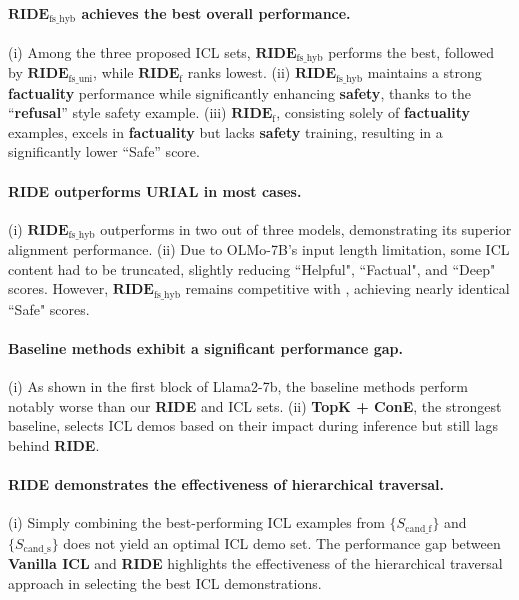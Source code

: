 \paragraph{$\textbf{RIDE}_{\text{fs\_hyb}}$ achieves the best overall performance.} (i) Among the three proposed ICL sets, $\textbf{RIDE}_{\text{fs\_hyb}}$ performs the best, followed by $\textbf{RIDE}_{\text{fs\_uni}}$, while $\textbf{RIDE}_{\text{f}}$ ranks lowest.
(ii) $\textbf{RIDE}_{\text{fs\_hyb}}$ maintains a strong \textbf{\color{myblue} factuality} performance while significantly enhancing \textbf{\color{myred} safety}, thanks to the ``\textbf{refusal}'' style safety example.
(iii) $\textbf{RIDE}_{\text{f}}$, consisting solely of \textbf{\color{myblue} factuality} examples, excels in \textbf{\color{myblue} factuality} but lacks \textbf{\color{myred} safety} training, resulting in a significantly lower ``Safe'' score.

\paragraph{\textbf{RIDE} outperforms \textbf{URIAL} in most cases.} (i) $\textbf{RIDE}_{\text{fs\_hyb}}$ outperforms \methodname{} in two out of three models, demonstrating its superior alignment performance.
(ii) Due to OLMo-7B's input length limitation, some ICL content had to be truncated, slightly reducing ``Helpful", ``Factual", and ``Deep" scores. However, $\textbf{RIDE}_{\text{fs\_hyb}}$ remains competitive with \methodname{}, achieving nearly identical ``Safe" scores.

\paragraph{Baseline methods exhibit a significant performance gap.} (i) As shown in the first block of Llama2-7b, the baseline methods perform notably worse than our \textbf{RIDE} and \methodname{} ICL sets. (ii) \textbf{TopK + ConE}, the strongest baseline, selects ICL demos based on their impact during inference but still lags behind \textbf{RIDE}.

\paragraph{\textbf{RIDE} demonstrates the effectiveness of hierarchical traversal.} (i) Simply combining the best-performing ICL examples from $\{S_\text{cand\_f}\}$ and $\{S_\text{cand\_s}\}$ does not yield an optimal ICL demo set.
The performance gap between \textbf{Vanilla ICL} and \textbf{RIDE} highlights the effectiveness of the hierarchical traversal approach in selecting the best ICL demonstrations.


